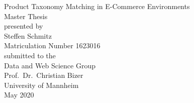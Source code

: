 \begin{titlepage}
    \vspace*{2cm}
    \begin{center}
    {\Large Product Taxonomy Matching in E-Commerce Environments\\}
        \vspace{2cm}
        {Master Thesis\\}
        \vspace{2cm}
        {presented by\\
        Steffen Schmitz \\
        Matriculation Number 1623016\\
        }
        \vspace{1cm}
        {submitted to the\\
        Data and Web Science Group\\
        Prof.\ Dr.\ Christian Bizer\\
        University of Mannheim\\} \vspace{2cm}
        {May 2020}
    \end{center}
\end{titlepage}